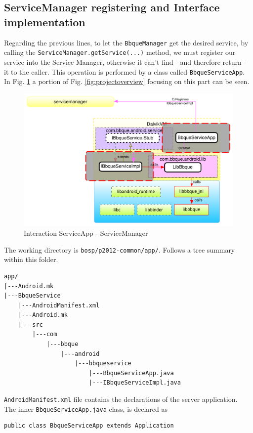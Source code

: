 \subsection{ServiceManager registering and Interface implementation}
Regarding the previous lines, to let the \texttt{BbqueManager} get the desired service, by calling the \texttt{ServiceManager.getService(...)} method, we must register our service into the Service Manager, otherwise it can't find - and therefore return - it to the caller. This operation is performed by a class called \texttt{BbqueServiceApp}. In Fig. \ref{fig:projectoverview_serviceapp} a portion of Fig. \ref{fig:projectoverview} focusing on this part can be seen.
\begin{figure}[!htb]
	\centering
	\includegraphics[scale=.505]{images/project_overview_IServiceImpl.pdf}
	\caption{Interaction ServiceApp - ServiceManager}
	\label{fig:projectoverview_serviceapp}
\end{figure}
The working directory is \texttt{bosp/p2012-common/app/}. Follows a tree summary within this folder.
\begin{verbatim}
app/
|---Android.mk
|---BbqueService
    |---AndroidManifest.xml
    |---Android.mk
    |---src
        |---com
            |---bbque
                |---android
                    |---bbqueservice
                        |---BbqueServiceApp.java
                        |---IBbqueServiceImpl.java
\end{verbatim}
\texttt{AndroidManifest.xml} file contains the declarations of the server application.\\
The inner \texttt{BbqueServiceApp.java} class, is declared as
\begin{verbatim}
public class BbqueServiceApp extends Application
\end{verbatim}
